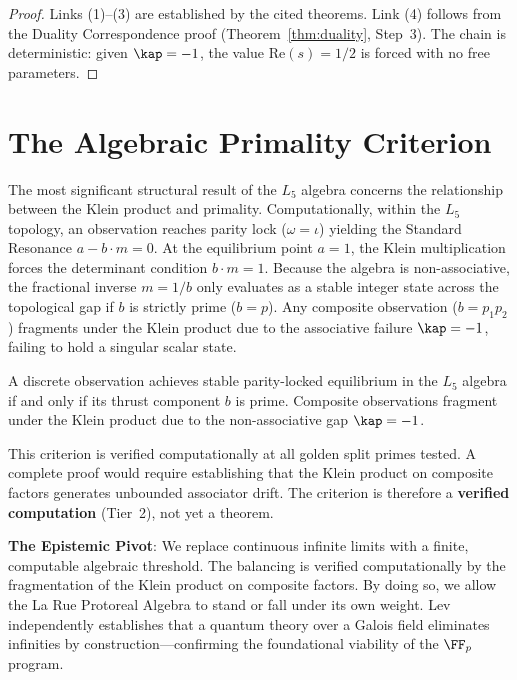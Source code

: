 \begin{proof}
Links (1)--(3) are established by the cited theorems. Link (4) follows from the Duality Correspondence proof (Theorem~\ref{thm:duality}, Step~3). The chain is deterministic: given $\kap = -1$, the value $\mathrm{Re}(s) = 1/2$ is forced with no free parameters. \qedhere
\end{proof}



\section{The Algebraic Primality Criterion}

The most significant structural result of the $L_5$ algebra concerns the relationship between the Klein product and primality. Computationally, within the $L_5$ topology, an observation reaches parity lock ($\omega = \iota$) yielding the Standard Resonance $a - b \cdot m = 0$. At the equilibrium point $a = 1$, the Klein multiplication forces the determinant condition $b \cdot m = 1$. Because the algebra is non-associative, the fractional inverse $m = 1/b$ only evaluates as a stable integer state across the topological gap if $b$ is strictly prime ($b = p$). Any composite observation ($b = p_1 p_2$) fragments under the Klein product due to the associative failure $\kap = -1$, failing to hold a singular scalar state.

\begin{result}\label{res:primality}
A discrete observation achieves stable parity-locked equilibrium in the $L_5$ algebra if and only if its thrust component $b$ is prime. Composite observations fragment under the Klein product due to the non-associative gap $\kap = -1$.
\end{result}

This criterion is verified computationally at all golden split primes tested. A complete proof would require establishing that the Klein product on composite factors generates unbounded associator drift. The criterion is therefore a \textbf{verified computation} (Tier~2), not yet a theorem.

\textbf{The Epistemic Pivot}: We replace continuous infinite limits with a finite, computable algebraic threshold. The balancing is verified computationally by the fragmentation of the Klein product on composite factors. By doing so, we allow the La Rue Protoreal Algebra to stand or fall under its own weight. Lev~\cite{lev-gfqt, lev-finite-math} independently establishes that a quantum theory over a Galois field eliminates infinities by construction---confirming the foundational viability of the $\FF_p$ program.

